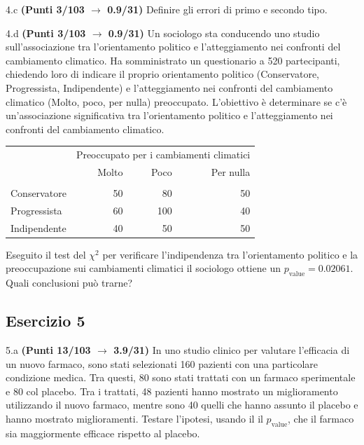 \documentclass[
  11pt,
]{book}
\theoremstyle{mytheoremstyle}
\theoremstyle{mydefstyle}
\begin{document}
4.c \textbf{(Punti 3/103 \(\rightarrow\) 0.9/31)} Definire gli errori di primo e secondo tipo.

4.d \textbf{(Punti 3/103 \(\rightarrow\) 0.9/31)} Un sociologo sta conducendo uno studio sull'associazione tra l'orientamento politico e l'atteggiamento nei confronti del cambiamento climatico. Ha somministrato un questionario a 520 partecipanti, chiedendo loro di indicare il proprio orientamento politico (Conservatore, Progressista, Indipendente) e l'atteggiamento nei confronti del cambiamento climatico (Molto, poco, per nulla) preoccupato. L'obiettivo è determinare se c'è un'associazione significativa tra l'orientamento politico e l'atteggiamento nei confronti del cambiamento climatico.

\begin{table}[H]
\centering\centering\centering
\begin{tabular}{lrrr}
\toprule
\multicolumn{1}{c}{ } & \multicolumn{3}{c}{Preoccupato per i cambiamenti climatici} \\
\cmidrule(l{3pt}r{3pt}){2-4}
  & Molto & Poco & Per nulla\\
\midrule
\addlinespace[0.3em]
\multicolumn{4}{l}{\textbf{Orientamento politico}}\\
\hspace{1em}Conservatore & 50 & 80 & 50\\
\hspace{1em}Progressista & 60 & 100 & 40\\
\hspace{1em}Indipendente & 40 & 50 & 50\\
\bottomrule
\end{tabular}
\end{table}

Eseguito il test del \(\chi^2\) per verificare l'indipendenza tra l'orientamento politico e la preoccupazione
sui cambiamenti climatici il sociologo ottiene un \(p_\text{value}=0.02061\). Quali conclusioni può trarne?

\subsection{Esercizio 5}\label{esercizio-5-31}

5.a \textbf{(Punti 13/103 \(\rightarrow\) 3.9/31)} In uno studio clinico per valutare l'efficacia di un nuovo farmaco, sono stati selezionati 160 pazienti con una particolare condizione medica. Tra questi, 80 sono stati trattati con un farmaco sperimentale e 80 col placebo. Tra i trattati, 48 pazienti hanno mostrato un miglioramento utilizzando il nuovo farmaco, mentre sono 40 quelli che hanno assunto il placebo e hanno mostrato miglioramenti. Testare l'ipotesi, usando il il \(p_\text{value}\), che il farmaco sia maggiormente efficace rispetto al placebo.
\end{document}
